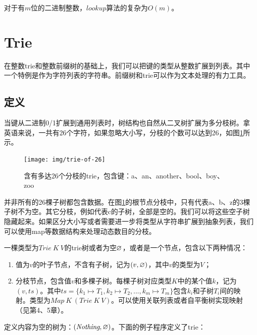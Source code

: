 \documentclass[b5paper]{ctexart}
\begin{document}
对于有$m$位的二进制整数，$lookup$算法的复杂为$O(m)$。

\begin{Exercise}
\end{Exercise}

\section{Trie}

在整数trie和整数前缀树的基础上，我们可以把键的类型从整数扩展到列表。其中一个特例是作为字符列表的字符串。前缀树和trie可以作为文本处理的有力工具。

\subsection{定义}
当键从二进制0/1扩展到通用列表时，树结构也自然从二叉树扩展为多分枝树。拿英语来说，一共有26个字符，如果忽略大小写，分枝的个数可以达到26，如图\ref{fig:trie-of-26}所示。

\begin{figure}[htbp]
  \centering
  \texttt{[image: img/trie-of-26]}
  \caption{含有多达26个分枝的trie，包含键：a、an、another、bool、boy、zoo}
  \label{fig:trie-of-26}
\end{figure}

并非所有的26棵子树都包含数据。在图\ref{fig:trie-of-26}的根节点分枝中，只有代表a、b、z的3棵子树不为空。其它分枝，例如代表c的子树，全部是空的。我们可以将这些空子树隐藏起来。如果区分大小写或者需要进一步将类型从字符串扩展到抽象列表，我们可以使用map等数据结构来处理动态数目的分枝。

一棵类型为$Trie\ K\ V$的trie树或者为空$\varnothing$，或者是一个节点，包含以下两种情况：

\begin{enumerate}
\item 值为$v$的叶子节点，不含有子树，记为$(v, \varnothing)$，其中$v$的类型为$V$；
\item 分枝节点，包含值$v$和多棵子树。每棵子树对应类型$K$中的某个值$k$，记为$(v, ts)$。其中$ts = \{ k_1 \mapsto T_1, k_2 \mapsto T_2, ..., k_m \mapsto T_m \}$包含$k_i$和子树$T_i$间的映射。类型为$Map\ K\ (Trie\ K\ V)$。可以使用关联列表或者自平衡树实现映射（见第4、5章）。
\end{enumerate}

定义内容为空的树为：$(\textit{Nothing}, \varnothing)$。下面的例子程序定义了trie：
\end{document}
